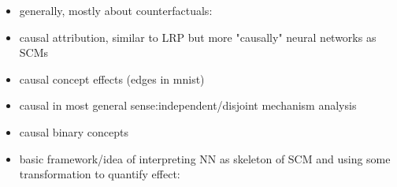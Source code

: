 \begin{itemize}
      \item generally, mostly about counterfactuals: \cite{Moraffah2020a}
      \item causal attribution, similar to LRP but more "causally" neural networks as SCMs \cite{Chattopadhyay2019}
      \item causal concept effects (edges in mnist) \cite{Goyal2019}
      \item causal in most general sense:independent/disjoint mechanism analysis \cite{Leemann2023} \cite{Leemann2022}
      \item causal binary concepts \cite{Tran2022}
      \item basic framework/idea of interpreting NN as skeleton of SCM and using some transformation to quantify effect:\cite{Narendra2018}
\end{itemize}



